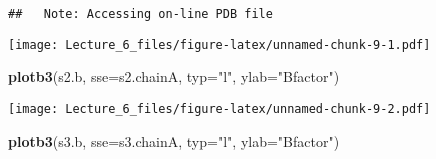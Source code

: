 \documentclass[]{article}
\newenvironment{Shaded}{\begin{snugshade}}{\end{snugshade}}
\newcommand{\CommentTok}[1]{\textcolor[rgb]{0.56,0.35,0.01}{\textit{#1}}}
\newcommand{\DataTypeTok}[1]{\textcolor[rgb]{0.13,0.29,0.53}{#1}}
\newcommand{\KeywordTok}[1]{\textcolor[rgb]{0.13,0.29,0.53}{\textbf{#1}}}
\newcommand{\NormalTok}[1]{#1}
\newcommand{\OperatorTok}[1]{\textcolor[rgb]{0.81,0.36,0.00}{\textbf{#1}}}
\newcommand{\StringTok}[1]{\textcolor[rgb]{0.31,0.60,0.02}{#1}}
\begin{document}
\begin{verbatim}
##   Note: Accessing on-line PDB file
\end{verbatim}

\begin{Shaded}
\end{Shaded}

\texttt{[image: Lecture\_6\_files/figure-latex/unnamed-chunk-9-1.pdf]}

\begin{Shaded}
\begin{Highlighting}[]
\KeywordTok{plotb3}\NormalTok{(s2.b, }\DataTypeTok{sse=}\NormalTok{s2.chainA, }\DataTypeTok{typ=}\StringTok{"l"}\NormalTok{, }\DataTypeTok{ylab=}\StringTok{"Bfactor"}\NormalTok{)}
\end{Highlighting}
\end{Shaded}

\texttt{[image: Lecture\_6\_files/figure-latex/unnamed-chunk-9-2.pdf]}

\begin{Shaded}
\begin{Highlighting}[]
\KeywordTok{plotb3}\NormalTok{(s3.b, }\DataTypeTok{sse=}\NormalTok{s3.chainA, }\DataTypeTok{typ=}\StringTok{"l"}\NormalTok{, }\DataTypeTok{ylab=}\StringTok{"Bfactor"}\NormalTok{)}
\end{Highlighting}
\end{Shaded}
\end{document}
